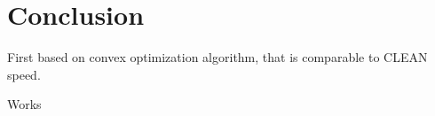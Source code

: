 \section{Conclusion}

First based on convex optimization algorithm, that is comparable to CLEAN speed.

Works

